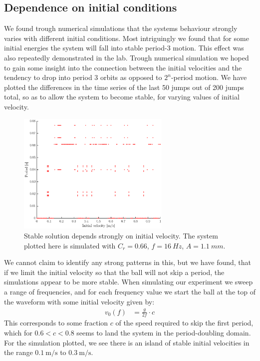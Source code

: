 \documentclass[12pt,oneside,a4paper]{article}
\numberwithin{equation}{section}
\begin{document}
{{{{\subsection{Dependence on initial conditions}
We found trough numerical simulations that the systems behaviour strongly varies with different initial conditions. Most intriguingly we found that for some initial energies the system will fall into stable period-3 motion. This effect was also repeatedly demonstrated in the lab. Trough numerical simulation we hoped to gain some insight into the connection between the initial velocities and the tendency to drop into period 3 orbits as opposed to $2^n$-period motion. We have plotted the differences in the time series of the last 50 jumps out of 200 jumps total, so as to allow the system to become stable, for varying values of initial velocity. 
\begin{figure}[h]
\centering
\includegraphics[width=0.65\textwidth]{vsweep.eps}
\caption{Stable solution depends strongly on initial velocity. The system plotted here is simulated with $C_r=0.66$, $f=\SI{16}{Hz}$, $A=\SI{1.1}{mm}$.}
\end{figure}
We cannot claim to identify any strong patterns in this, but we have found, that if we limit the initial velocity so that the ball will not skip a period, the simulations appear to be more stable. When simulating our experiment we sweep a range of frequencies, and for each frequency value we start the ball at the top of the waveform with some initial velocity given by:
\begin{align*}
v_0(f) &= \frac{g}{2f} \cdot c
\end{align*}
This corresponds to some fraction $c$ of the speed required to skip the first period, which for $0.6<c<0.8$ seems to land the system in the period-doubling domain. For the simulation plotted, we see there is an island of stable initial velocities in the range $\SI{0.1}{\meter\per\second}$ to $\SI{0.3}{\meter\per\second}$.
}}}}
\end{document}

